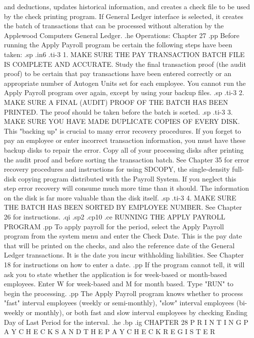 and deductions, updates historical information, and creates
a check file to be used by the check printing program.	If General
Ledger interface is selected, it creates the batch of transactions
that can be processed without alteration by the Applewood Computers General Ledger.
.he Operations: Chapter 27
.pp
Before running the Apply Payroll program be certain the following
steps have been taken:
.sp
.in6
.ti-3
1. MAKE SURE THE PAY TRANSACTION BATCH FILE IS COMPLETE AND ACCURATE.
Study the final transaction proof (the audit proof) to be certain
that pay transactions have been entered correctly or an appropriate
number of Autogen Units set for each employee. You cannot run the
Apply Payroll program over again, except by using your backup files.
.sp
.ti-3
2. MAKE SURE A FINAL (AUDIT) PROOF OF THE BATCH HAS BEEN PRINTED.
The proof should be taken before the batch is sorted.
.sp
.ti-3
3. MAKE SURE YOU HAVE MADE DUPLICATE COPIES OF EVERY DISK.  This "backing
up" is crucial to many error recovery procedures. If you forget to
pay an employee or enter incorrect transaction information, you must have
these backup disks to repair the error.  Copy all of your processing disks
after printing the audit proof and before sorting the transaction batch.
See Chapter 35 for error recovery procedures and instructions
for using SDCOPY, the single-density full-disk copying program distributed
with the Payroll System. If you neglect this step error recovery will
consume much more time than it should.	The information on the disk
is far more valuable than the disk itself.
.sp
.ti-3
4. MAKE SURE THE BATCH HAS BEEN SORTED BY EMPLOYEE NUMBER.  See Chapter
26 for instructions.
.qi
.sp2
.cp10
.ce
RUNNING THE APPLY PAYROLL PROGRAM
.pp
To apply payroll for the period, select the Apply Payroll program
from the system menu and enter the Check Date.
This is the pay date that will be printed on the checks, and also
the reference date of the General Ledger transactions.	It is the
date you incur withholding liabilities.  See Chapter 18 for instructions
on how to enter a date.
.pp
If the program cannot tell, it will ask you to state whether the
application is for week-based or month-based employees.  Enter
W for week-based and M for month based.  Type "RUN" to begin the
processing.
.pp
The Apply Payroll program knows whether to process
"fast" interval employees (weekly or semi-monthly), "slow" interval
employees (bi-weekly or monthly), or both fast and slow interval employees
by checking Ending Day of Last Period for the interval.
.he
.bp
.ig
CHAPTER 28
P R I N T I N G    P A Y C H E C K S
A N D	 T H E	  P A Y C H E C K    R E G I S T E R
